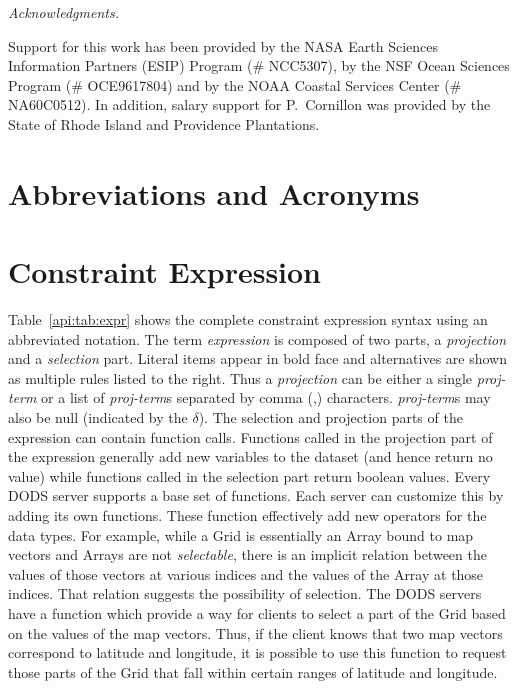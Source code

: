 \documentclass{article}
\begin{document}
\bigskip
\noindent \emph{Acknowledgments.}

Support for this work has been provided by the \acs{NASA} Earth Sciences 
Information Partners (ESIP) Program (\# NCC5307), by the \acs{NSF} Ocean 
Sciences Program (\# OCE9617804) and by the \acs{NOAA} Coastal Services 
Center (\# NA60C0512). In addition, salary support for
P.~Cornillon was provided by the State of Rhode Island and Providence
Plantations.

\appendix

\newpage\section{Abbreviations and Acronyms}
\begin{acronym}

\end{acronym}

\newpage\section{Constraint Expression}

Table~\ref{api:tab:expr} shows the complete constraint expression syntax
using an abbreviated notation. The term \emph{expression} is composed of two
parts, a \emph{projection} and a \emph{selection} part. Literal items appear
in bold face and alternatives are shown as multiple rules listed to the
right. Thus a \emph{projection} can be either a single \emph{proj-term} or a
list of \emph{proj-term}s separated by comma (,) characters.
\emph{proj-term}s may also be null (indicated by the $\delta$).  The
selection and projection parts of the expression can contain function calls.
Functions called in the projection part of the expression generally add new
variables to the dataset (and hence return no value) while functions called
in the selection part return boolean values. Every \ac{DODS} server supports
a base set of functions.  Each server can customize this by adding its own
functions. These function effectively add new operators for the data types.
For example, while a Grid is essentially an Array bound to map vectors and
Arrays are not \emph{selectable}, there is an implicit relation between the
values of those vectors at various indices and the values of the Array at
those indices. That relation suggests the possibility of selection. The
\ac{DODS} servers have a function which provide a way for clients to select a
part of the Grid based on the values of the map vectors.  Thus, if the client
knows that two map vectors correspond to latitude and longitude, it is
possible to use this function to request those parts of the Grid that fall
within certain ranges of latitude and longitude.
\end{document}
